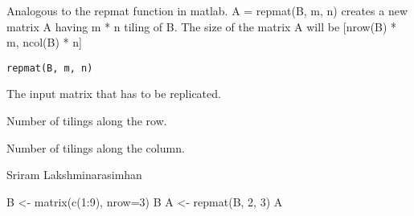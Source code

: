 \begin{Description}\relax
Analogous to the repmat function in matlab. A = repmat(B, m, n) creates a new matrix A having m * n tiling of B.
The size of the matrix A will be [nrow(B) * m, ncol(B) * n]
\end{Description}
\begin{Usage}
\begin{verbatim}
repmat(B, m, n)
\end{verbatim}
\end{Usage}
\begin{Arguments}
\begin{ldescription}
\item[\code{B}] The input matrix that has to be replicated.

\item[\code{m}] Number of tilings along the row.

\item[\code{n}] Number of tilings along the column.

\end{ldescription}
\end{Arguments}
\begin{Author}\relax
Sriram Lakshminarasimhan
\end{Author}
\begin{Examples}
\begin{ExampleCode}
B <- matrix(c(1:9), nrow=3)
B
A <- repmat(B, 2, 3)
A
\end{ExampleCode}
\end{Examples}

